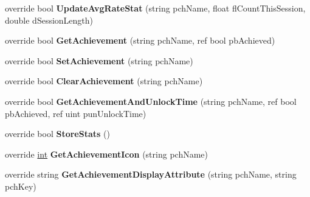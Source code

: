 \begin{DoxyCompactItemize}
\item 
\hypertarget{classValve_1_1Steamworks_1_1CSteamUserStats_ad61476d48a4bc5d2f984097dcf35b064}{}override bool {\bfseries Update\+Avg\+Rate\+Stat} (string pch\+Name, float fl\+Count\+This\+Session, double d\+Session\+Length)\label{classValve_1_1Steamworks_1_1CSteamUserStats_ad61476d48a4bc5d2f984097dcf35b064}

\item 
\hypertarget{classValve_1_1Steamworks_1_1CSteamUserStats_aea76acf926b86d1a2cf1c06a1f7b292f}{}override bool {\bfseries Get\+Achievement} (string pch\+Name, ref bool pb\+Achieved)\label{classValve_1_1Steamworks_1_1CSteamUserStats_aea76acf926b86d1a2cf1c06a1f7b292f}

\item 
\hypertarget{classValve_1_1Steamworks_1_1CSteamUserStats_aade2aa7506ee78dd005a678c4c0c9434}{}override bool {\bfseries Set\+Achievement} (string pch\+Name)\label{classValve_1_1Steamworks_1_1CSteamUserStats_aade2aa7506ee78dd005a678c4c0c9434}

\item 
\hypertarget{classValve_1_1Steamworks_1_1CSteamUserStats_a5a86b3e265407512045b3577976a62b2}{}override bool {\bfseries Clear\+Achievement} (string pch\+Name)\label{classValve_1_1Steamworks_1_1CSteamUserStats_a5a86b3e265407512045b3577976a62b2}

\item 
\hypertarget{classValve_1_1Steamworks_1_1CSteamUserStats_afb1c33e937e54f92d81202503f209dd0}{}override bool {\bfseries Get\+Achievement\+And\+Unlock\+Time} (string pch\+Name, ref bool pb\+Achieved, ref uint pun\+Unlock\+Time)\label{classValve_1_1Steamworks_1_1CSteamUserStats_afb1c33e937e54f92d81202503f209dd0}

\item 
\hypertarget{classValve_1_1Steamworks_1_1CSteamUserStats_af580acbcebd317d1d946d73723adf067}{}override bool {\bfseries Store\+Stats} ()\label{classValve_1_1Steamworks_1_1CSteamUserStats_af580acbcebd317d1d946d73723adf067}

\item 
\hypertarget{classValve_1_1Steamworks_1_1CSteamUserStats_a82c09c327983132128728915fb1c72cd}{}override \hyperlink{SDL__thread_8h_a6a64f9be4433e4de6e2f2f548cf3c08e}{int} {\bfseries Get\+Achievement\+Icon} (string pch\+Name)\label{classValve_1_1Steamworks_1_1CSteamUserStats_a82c09c327983132128728915fb1c72cd}

\item 
\hypertarget{classValve_1_1Steamworks_1_1CSteamUserStats_a493c9e8b5b7ce124d2b95083f2cf29fe}{}override string {\bfseries Get\+Achievement\+Display\+Attribute} (string pch\+Name, string pch\+Key)\label{classValve_1_1Steamworks_1_1CSteamUserStats_a493c9e8b5b7ce124d2b95083f2cf29fe}


\end{DoxyCompactItemize}
